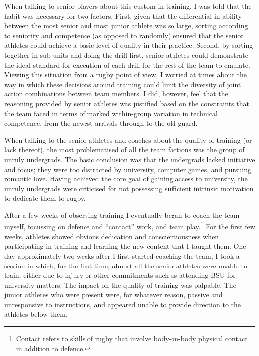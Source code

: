 \begin{CJK}{UTF8}{gbsn}
When talking to senior players about this custom in training, I was told that the habit was necessary for two factors. First, given that the differential in ability between the most senior and most junior athlete was so large, sorting according to seniority and competence (as opposed to randomly) ensured that the senior athletes could achieve a basic level of quality in their practice.  Second, by sorting together in sub units and doing the drill first, senior athletes could demonstrate the ideal standard for execution of each drill for the rest of the team to emulate.  Viewing this situation from a rugby point of view, I worried at times about the way in which these decisions around training could limit the diversity of joint action combinations between team members. I did, however, feel that the reasoning provided by senior athletes was justified based on the constraints that the team faced in terms of marked within-group variation in technical competence, from the newest arrivals through to the old guard.

When talking to the senior athletes and coaches about the quality of training (or lack thereof), the most problematised of all the team factions was the group of unruly undergrads.  The basic conclusion was that the undergrads lacked initiative and focus; they were too distracted by university, computer games, and pursuing romantic love. Having achieved the core goal of gaining access to university, the unruly undergrads were criticised for not possessing sufficient intrinsic motivation to dedicate them to rugby.

After a few weeks of observing training I eventually began to coach the team myself, focussing on defence and ``contact'' work, and team play.\footnote{Contact refers to skills of rugby that involve body-on-body physical contact in addition to defence.}  For the first few weeks, athletes showed obvious dedication and conscientiousness when participating in training and learning the new content that I taught them.  One day approximately two weeks after I first started coaching the team,  I took a session in which, for the first time, almost all the senior athletes were unable to train, either due to injury or other commitments such as attending BSU for university matters.  The impact on the quality of training was palpable.  The junior athletes who were present were, for whatever reason, passive and unresponsive to instructions, and appeared unable to provide direction to the athletes below them.


\end{CJK}
